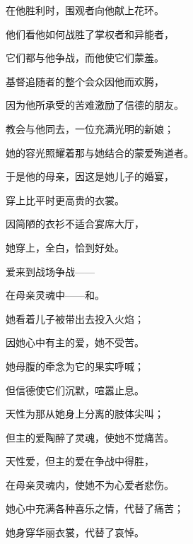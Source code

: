 在他胜利时，围观者向他献上花环。\par

他们看他如何战胜了掌权者和异能者，\par

它们都与他争战，而他使它们蒙羞。\par

基督追随者的整个会众因他而欢腾，\par

因为他所承受的苦难激励了信德的朋友。\par

教会与他同去，一位充满光明的新娘；\par

她的容光照耀着那与她结合的蒙爱殉道者。\par

于是他的母亲，因这是她儿子的婚宴，\par

穿上比平时更高贵的衣裳。\par

因简陋的衣衫不适合宴席大厅，\par

她穿上，全白，恰到好处。\par

爱来到战场争战——\par

在母亲灵魂中——和。\par

她看着儿子被带出去投入火焰；\par

因她心中有主的爱，她不受苦。\par

她母腹的牵念为它的果实呼喊；\par

但信德使它们沉默，喧嚣止息。\par

天性为那从她身上分离的肢体尖叫；\par

但主的爱陶醉了灵魂，使她不觉痛苦。\par

天性爱，但主的爱在争战中得胜，\par

在母亲灵魂内，使她不为心爱者悲伤。\par

她心中充满各种喜乐之情，代替了痛苦；\par

她身穿华丽衣裳，代替了哀悼。\par

